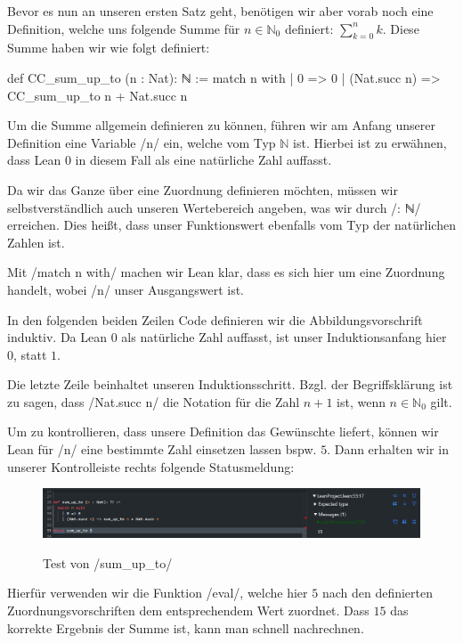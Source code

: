 \documentclass[10pt]{article}
\begin{document}
\noindent Bevor es nun an unseren ersten Satz geht, benötigen wir aber vorab noch eine Definition, welche uns folgende Summe für $n\in \mathbb{N}_0$ definiert: $\sum_{k=0}^{n}k$. Diese Summe haben wir wie folgt definiert:
\begin{leancode}
def CC_sum_up_to (n : Nat): ℕ :=
  match n with
    | 0 => 0
    | (Nat.succ n) => CC_sum_up_to n + Nat.succ n
\end{leancode}
Um die Summe allgemein definieren zu können, führen wir am Anfang unserer Definition eine Variable \lean/n/ ein, welche vom Typ $\mathbb{N}$ ist. Hierbei ist zu erwähnen, dass Lean $0$ in diesem Fall als eine natürliche Zahl auffasst.\par
\noindent Da wir das Ganze über eine Zuordnung definieren möchten, müssen wir selbstverständlich auch unseren Wertebereich angeben, was wir durch \lean/: ℕ/ erreichen. Dies heißt, dass unser Funktionswert ebenfalls vom Typ der natürlichen Zahlen ist.

\noindent Mit \lean/match n with/ machen wir Lean klar, dass es sich hier um eine Zuordnung handelt, wobei \lean/n/ unser Ausgangswert ist.\par

\noindent In den folgenden beiden Zeilen Code definieren wir die Abbildungsvorschrift induktiv. Da Lean $0$ als natürliche Zahl auffasst, ist unser Induktionsanfang hier $0$, statt $1$.\par

\noindent Die letzte Zeile beinhaltet unseren Induktionsschritt. Bzgl. der Begriffsklärung ist zu sagen, dass \lean/Nat.succ n/ die Notation für die Zahl $n+1$ ist, wenn $n\in \mathbb{N}_0$ gilt.

\noindent Um zu kontrollieren, dass unsere Definition das Gewünschte liefert, können wir Lean für \lean/n/ eine bestimmte Zahl einsetzen lassen bspw. $5$. Dann erhalten wir in unserer Kontrolleiste rechts folgende Statusmeldung:
\begin{figure}[H]
    \centering
    \includegraphics[scale=0.5]{sum_up_to 5.png}
    \label{Abb2}
    \caption{Test von \lean/sum_up_to/}
    
\end{figure}
\noindent Hierfür verwenden wir die Funktion \lean/eval/, welche hier $5$ nach den definierten Zuordnungsvorschriften dem entsprechendem Wert zuordnet. Dass $15$ das korrekte Ergebnis der Summe ist, kann man schnell nachrechnen.
\end{document}
